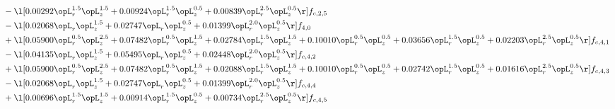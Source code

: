 \begin{alignat}{2}
& - \l[  0.00292 \opL_r^{1.5} \opL_z^{1.5} +  0.00924 \opL_r^{1.5} \opL_z^{0.5} +  0.00839 \opL_r^{2.5} \opL_z^{0.5}  \r] f_{c,2,5} \nonumber \\ 
& - \l[  0.02068 \opL_r \opL_z^{1.5} +  0.02747 \opL_r \opL_z^{0.5} +  0.01399 \opL_r^{2.0} \opL_z^{0.5}  \r] f_{4,0} \nonumber \\ 
& + \l[  0.05900 \opL_r^{0.5} \opL_z^{2.5} +  0.07482 \opL_r^{0.5} \opL_z^{1.5} +  0.02784 \opL_r^{1.5} \opL_z^{1.5} +  0.10010 \opL_r^{0.5} \opL_z^{0.5} +  0.03656 \opL_r^{1.5} \opL_z^{0.5} +  0.02203 \opL_r^{2.5} \opL_z^{0.5}  \r] f_{c,4,1} \nonumber \\ 
& - \l[  0.04135 \opL_r \opL_z^{1.5} +  0.05495 \opL_r \opL_z^{0.5} +  0.02448 \opL_r^{2.0} \opL_z^{0.5}  \r] f_{c,4,2} \nonumber \\ 
& + \l[  0.05900 \opL_r^{0.5} \opL_z^{2.5} +  0.07482 \opL_r^{0.5} \opL_z^{1.5} +  0.02088 \opL_r^{1.5} \opL_z^{1.5} +  0.10010 \opL_r^{0.5} \opL_z^{0.5} +  0.02742 \opL_r^{1.5} \opL_z^{0.5} +  0.01616 \opL_r^{2.5} \opL_z^{0.5}  \r] f_{c,4,3} \nonumber \\ 
& - \l[  0.02068 \opL_r \opL_z^{1.5} +  0.02747 \opL_r \opL_z^{0.5} +  0.01399 \opL_r^{2.0} \opL_z^{0.5}  \r] f_{c,4,4} \nonumber \\ 
& + \l[  0.00696 \opL_r^{1.5} \opL_z^{1.5} +  0.00914 \opL_r^{1.5} \opL_z^{0.5} +  0.00734 \opL_r^{2.5} \opL_z^{0.5}  \r] f_{c,4,5} \nonumber \\ 
\end{alignat} 


